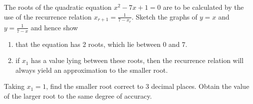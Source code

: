 \begin{problem}
    The roots of the quadratic equation $x^2 - 7x + 1 = 0$ are to be calculated by the use of the recurrence relation $x_{r + 1} = \frac1{7 - x_r}$. Sketch the graphs of $y = x$ and $y = \frac1{7-x}$ and hence show
    \begin{enumerate}
        \item that the equation has 2 roots, which lie between 0 and 7.
        \item if $x_1$ has a value lying between these roots, then the recurrence relation will always yield an approximation to the smaller root.
    \end{enumerate}

    Taking $x_1 = 1$, find the smaller root correct to 3 decimal places. Obtain the value of the larger root to the same degree of accuracy.
\end{problem}
